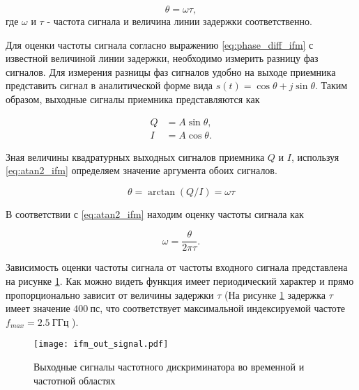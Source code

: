 \begin{equation}
	\theta = \omega \tau ,
	\label{eq:phase_diff_ifm}
\end{equation}
где \(\omega\) и \(\tau\) - частота сигнала и величина линии задержки соответственно.

Для оценки частоты сигнала согласно выражению \eqref{eq:phase_diff_ifm} с известной величиной линии задержки, необходимо измерить разницу фаз сигналов. Для измерения разницы фаз сигналов удобно на выходе приемника представить сигнал в аналитической форме вида \( s(t) = \cos{\theta} + j \sin{\theta} \). Таким образом, выходные сигналы приемника представляются как

\begin{equation}
	\begin{aligned}
		Q &= A \sin{\theta}, \\
		I &= A \cos{\theta}.
	\end{aligned}
	\label{eq:quadrature_ifm}
\end{equation}

Зная величины квадратурных выходных сигналов приемника \(Q\) и \(I\), используя \eqref{eq:atan2_ifm} определяем значение аргумента обоих сигналов.

\begin{equation}
	\theta = \arctan(Q/I) = \omega \tau
	\label{eq:atan2_ifm}
\end{equation}

В соответствии с \eqref{eq:atan2_ifm} находим оценку частоты сигнала как

\begin{equation}
	\omega = \frac{\theta}{2 \pi \tau}.
	\label{eq:ifm_freq_estimation}
\end{equation}

Зависимость оценки частоты сигнала от частоты входного сигнала представлена на рисунке \ref{ct:ifm_out_signal}. Как можно видеть функция имеет периодический характер и прямо пропорционально зависит от величины задержки \(\tau\) (На рисунке \ref{ct:ifm_out_signal} задержка \(\tau \) имеет значение \(400~\textrm{пс}\), что соответствует максимальной индексируемой частоте \(f_{max} = 2.5~\textrm{ГГц}\) ).

\begin{figure}[ht]
	\centering
	\texttt{[image: ifm\_out\_signal.pdf]}
	
	\caption{Выходные сигналы частотного дискриминатора во временной и частотной областях}
	\label{ct:ifm_out_signal}
\end{figure}

